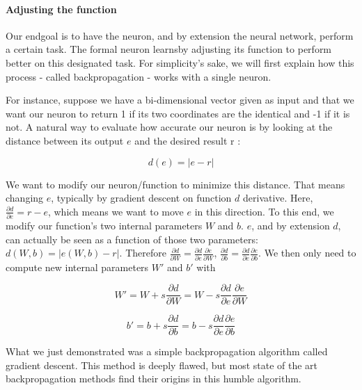 \documentclass[conference]{IEEEtran}
\begin{document}
\paragraph{Adjusting the function}

Our endgoal is to have the neuron, and by extension the neural network, perform
a certain task. The formal neuron \og learns\fg by adjusting its function to perform better on
this designated task. For simplicity's sake, we will first explain how this
process - called \og backpropagation\fg{} - works with a single neuron.

For instance, suppose we have a bi-dimensional vector given as input and that we
want our neuron to return 1 if its two coordinates are the identical and -1 if
it is not. A natural way to evaluate how accurate our neuron is by looking at the
distance between its output $e$ and the desired result r :

\begin{equation}
d(e)=|e-r|  
\end{equation}

We want to modify our neuron/function to minimize this distance. That means
changing $e$, typically by gradient descent on function $d$ derivative. Here,
$\frac{\partial d}{\partial e} = r-e$, which means we want to \og move\fg{} $e$ in this
direction. To this end, we modify our function's two internal parameters $W$ and
$b$. $e$, and by extension $d$, can actually be seen as a function of those two
parameters: $d(W,b)=|e(W,b)-r|$. Therefore $\frac{\partial d}{\partial W}
   = \frac{\partial d}{\partial e}\frac{\partial e}{\partial W}$,
$\frac{\partial d}{\partial b}
   = \frac{\partial d}{\partial e}\frac{\partial e}{\partial b}$. We then only
   need to compute new internal parameters $W'$ and $b'$ with 

\begin{equation}
     W'=W + s\frac{\partial d}{\partial W}=W-s\frac{\partial d}{\partial e}\frac{\partial e}{\partial W}
\end{equation}

\begin{equation}
     b'=b + s\frac{\partial d}{\partial b}=b-s\frac{\partial d}{\partial e}\frac{\partial e}{\partial b}
\end{equation}

What we just demonstrated was a simple backpropagation algorithm called gradient
descent. This method is deeply flawed, but most state of the art backpropagation
methods find their origins in this humble algorithm.
\end{document}
